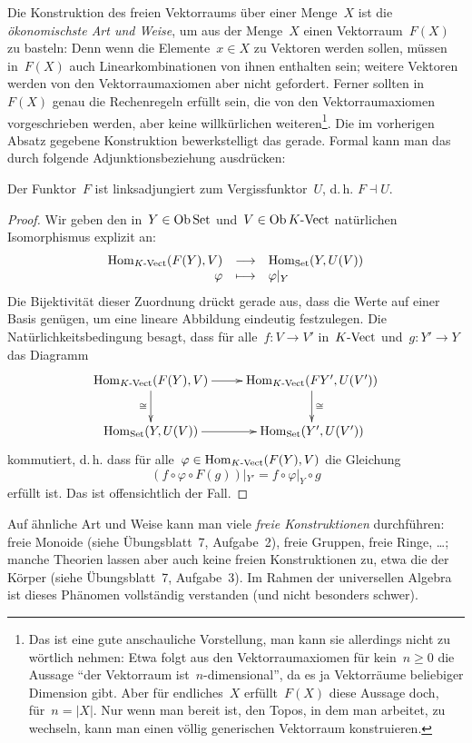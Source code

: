 Die Konstruktion des freien Vektorraums über einer Menge~$X$ ist die
\emph{ökonomischste Art und Weise}, um aus der Menge~$X$ einen
Vektorraum~$F(X)$ zu basteln: Denn wenn die Elemente~$x \in X$ zu Vektoren
werden sollen, müssen in~$F(X)$ auch Linearkombinationen von ihnen enthalten
sein; weitere Vektoren werden von den Vektorraumaxiomen aber nicht gefordert.
Ferner sollten in~$F(X)$ genau die Rechenregeln erfüllt sein, die von den
Vektorraumaxiomen vorgeschrieben werden, aber keine willkürlichen
weiteren\footnote{Das ist eine gute anschauliche Vorstellung, man kann sie
allerdings nicht zu wörtlich nehmen: Etwa folgt aus den Vektorraumaxiomen für
kein~$n \geq 0$ die Aussage "`der Vektorraum ist~$n$-dimensional"', da es ja
Vektorräume beliebiger Dimension gibt. Aber für endliches~$X$ erfüllt~$F(X)$
diese Aussage doch, für~$n = |X|$. Nur wenn man bereit ist, den Topos, in dem man
arbeitet, zu wechseln, kann man einen völlig generischen Vektorraum
konstruieren.}. Die im vorherigen Absatz gegebene Konstruktion
bewerkstelligt das gerade. Formal kann man das durch folgende Adjunktionsbeziehung
ausdrücken:
\begin{prop}Der Funktor~$F$ ist
linksadjungiert zum Vergissfunktor~$U$, d.\,h. $F \dashv U$.
\end{prop}
\begin{proof}
Wir geben den in~$Y \in \operatorname{Ob}\mathrm{Set}$ und~$V \in \operatorname{Ob}{K\text{-}\mathrm{Vect}}$ natürlichen
Isomorphismus explizit an:
\[ \begin{array}{@{}rcl@{}}
  \Hom_{\Vect{K}}(F(Y), V) &\longrightarrow& \Hom_\Set(Y, U(V)) \\
  \varphi &\longmapsto& \varphi|_Y
\end{array} \]
Die Bijektivität dieser Zuordnung drückt gerade aus, dass die Werte auf einer
Basis genügen, um eine lineare Abbildung eindeutig festzulegen. Die
Natürlichkeitsbedingung besagt, dass für alle~$f:V \to V'$ in~${K\text{-}\mathrm{Vect}}$ und~$g:Y' \to Y$
das Diagramm
\[ \xymatrix{
  \Hom_{\Vect{K}}(F(Y),V) \ar[r] \ar[d]_\cong & \Hom_{\Vect{K}}(FY',U(V')) \ar[d]^\cong \\
  \Hom_\Set(Y,U(V)) \ar[r] & \Hom_\Set(Y',U(V'))
} \]
kommutiert, d.\,h. dass für alle~$\varphi \in \mathrm{Hom}_{{K\text{-}\mathrm{Vect}}}(F(Y),V)$ die Gleichung
\[
  (f \circ \varphi \circ F(g))|_{Y'} = f \circ \varphi|_Y \circ g
\]
erfüllt ist. Das ist offensichtlich der Fall.
\end{proof}

Auf ähnliche Art und Weise kann man viele \emph{freie Konstruktionen}
durchführen: freie Monoide (siehe Übungsblatt~7, Aufgabe~2), freie Gruppen,
freie Ringe, \ldots; manche Theorien lassen aber auch keine freien
Konstruktionen zu, etwa die der Körper (siehe Übungsblatt~7, Aufgabe~3). Im
Rahmen der universellen Algebra ist dieses Phänomen vollständig verstanden (und
nicht besonders schwer).

